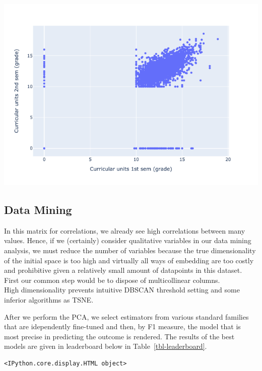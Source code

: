 \documentclass[
  letterpaper,
  DIV=11,
  numbers=noendperiod]{scrartcl}
\begin{document}
\includegraphics{report_AzadhdhinNedalYunisAlFraijat_files/figure-pdf/cell-57-output-1.png}

\hypertarget{data-mining}{%
\subsection{Data Mining}\label{data-mining}}

In this matrix for correlations, we already see high correlations
between many values. Hence, if we (certainly) consider qualitative
variables in our data mining analysis, we must reduce the number of
variables because the true dimensionality of the initial space is too
high and virtually all ways of embedding are too costly and prohibitive
given a relatively small amount of datapoints in this dataset. First our
common step would be to dispose of multicollinear columns.\\
High dimensionality prevents intuitive DBSCAN threshold setting and some
inferior algorithms as TSNE.

After we perform the PCA, we select estimators from various standard
families that are idependently fine-tuned and then, by F1 measure, the
model that is most precise in predicting the outcome is rendered. The
results of the best models are given in leaderboard below in
Table~\ref{tbl-leaderboard}.

\begin{verbatim}
<IPython.core.display.HTML object>
\end{verbatim}
\end{document}

